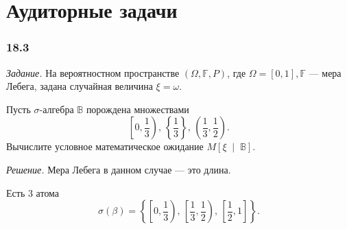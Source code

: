 \section*{Аудиторные задачи}

\subsubsection*{18.3}

\textit{Задание.}
На вероятностном пространстве $ \left( \Omega, \mathbb{F}, P \right) $,
где $ \Omega = \left[ 0, 1 \right], \mathbb{F}$ --- мера Лебега,
задана случайная величина $ \xi = \omega $.

Пусть $ \sigma $-алгебра $ \mathbb{B}$ порождена множествами
$$ \left[ 0, \frac{1}{3} \right), \,
  \left\{ \frac{1}{3} \right\}, \,
  \left( \frac{1}{3}, \frac{1}{2} \right).$$
Вычислите условное математическое ожидание $M \left[ \xi \; \middle| \; \mathbb{B} \right] $.

\textit{Решение.} Мера Лебега в данном случае --- это длина.

Есть 3 атома
$$ \sigma \left( \beta \right) =
  \left\{
    \left[ 0, \frac{1}{3} \right), \,
    \left[ \frac{1}{3}, \frac{1}{2} \right), \,
    \left[ \frac{1}{2}, 1 \right]
  \right\}.$$

